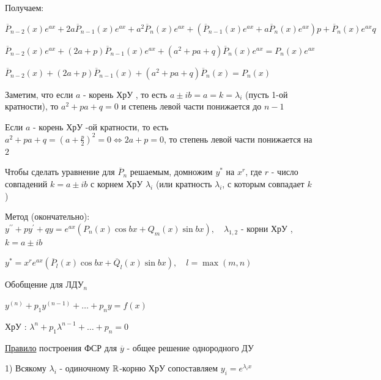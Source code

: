 \documentclass[12pt]{article}
\begin{document}
    \vspace{5mm}
    Получаем:

    $\displaystyle \overline{P}_{n - 2} (x) e^{ax} + 2a\overline{P}_{n - 1} (x) e^{ax} + a^2\overline{P}_n(x) e^{ax} + (\overline{P}_{n - 1} (x) e^{ax} + a\overline{P}_n(x) e^{ax})p + \overline{P}_n(x) e^{ax} q $

    $\displaystyle \overline{P}_{n - 2} (x) e^{ax} + (2a + p)\overline{P}_{n - 1} (x) e^{ax} + (a^2 + pa + q)\overline{P}_n(x) e^{ax} = P_n(x) e^{ax}$

    $\displaystyle \overline{P}_{n - 2} (x) + (2a + p)\overline{P}_{n - 1} (x) + (a^2 + pa + q)\overline{P}_n(x) = P_n(x)$

    Заметим, что если $a$ - корень ХрУ \Cat, то есть $\displaystyle a \pm ib = a = k = \lambda_i$ (пусть 1-ой кратности), то $\displaystyle a^2 + pa + q = 0$ и степень
    левой части понижается до $n - 1$

    Если $a$ - корень ХрУ -ой кратности, то есть $\displaystyle a^2 + pa + q = \left(a + \frac{p}{2}\right)^2 = 0 \Longleftrightarrow 2a + p = 0$, то степень левой части понижается на $2$

    Чтобы сделать уравнение для $\displaystyle \overline{P}_n$ решаемым, домножим $\displaystyle y^*$ на $\displaystyle x^r$, где $r$ - число совпадений $k = a \pm ib$ с корнем ХрУ $\displaystyle \lambda_i$ (или кратность $\displaystyle \lambda_i$, с которым совпадает $k$)

    \vspace{5mm}
    Метод (окончательно): $\displaystyle y^{\prime\prime} + py^\prime + qy = e^{ax} (P_n(x)\cos bx + Q_m (x)\sin bx), \quad \lambda_{1,2}$ - корни ХрУ \Cat, $k = a \pm ib$

    $\displaystyle y^* = x^r e^{ax} (\overline{P}_l (x)\cos bx + \overline{Q}_l (x) \sin bx), \quad l = \max(m, n)$

    \vspace{5mm}
    Обобщение для ЛДУ$\displaystyle _n$

    $\displaystyle y^{(n)} + p_1 y^{(n - 1)} + \dots + p_n y = f(x)$

    ХрУ \Cat: $\displaystyle \lambda^n + p_1 \lambda^{n - 1} + \dots + p_n = 0$

    \vspace{5mm}
    \underline{Правило} построения ФСР для $\overline{y}$ - общее решение однородного ДУ

    1) Всякому $\displaystyle \lambda_i$ - одиночному $\mathbb{R}$-корню ХрУ сопоставляем $\displaystyle y_i = e^{\lambda_i x}$
\end{document}
